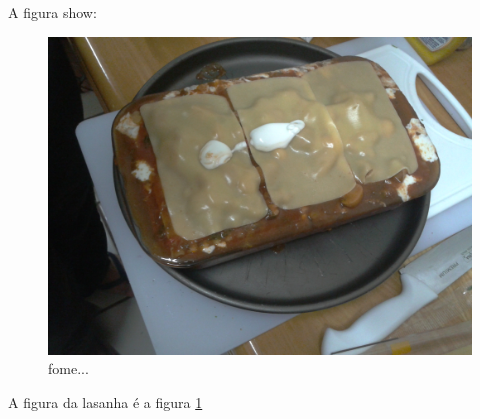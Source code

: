 \documentclass{report}
\begin{document}
A figura show:

\begin{figure}[H]
	\centering
	\includegraphics[width = \textwidth]{./figuraA.jpg}
	\caption{fome...}
	\label{fig:lasanha}
\end{figure}
A figura da lasanha é a figura \ref{fig:lasanha}


\end{document}

